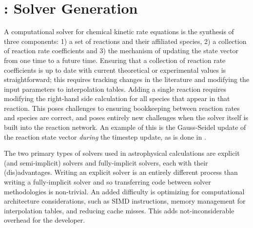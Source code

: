 \section{\dengo{}: Solver Generation}

A computational solver for chemical kinetic rate equations is the synthesis of
three components: 1) a set of reactions and their affiliated species,
2) a collection of reaction rate coefficients and 3) the mechanism of updating
the state vector from one time to a future time.  Ensuring that a collection of
reaction rate coefficients is up to date with current theoretical or
experimental values is straightforward; this requires tracking changes in the
literature and modifying the input parameters to interpolation tables.
Adding a single reaction requires modifying the right-hand side
calculation for all species that appear in that reaction.  This poses
challenges to ensuring bookkeeping between reaction rates and species are
correct, and poses entirely new challenges when the solver itself is
built into the reaction network.  An example of this is the
Gauss-Seidel update of the reaction state vector \textit{during} the
timestep update, as is done in \grackle{}.


The two primary types of solvers used in astrophysical calculations
are explicit (and semi-implicit) solvers and fully-implicit solvers,
each with their (dis)advantages.
Writing an explicit solver is an entirely different process than
writing a fully-implicit solver and so transferring code between
solver methodologies is non-trivial.
An added difficulty is optimizing for computational architecture considerations,
such as SIMD instructions, memory management for interpolation tables,
and reducing cache misses. This adds not-inconsiderable overhead for the developer.



